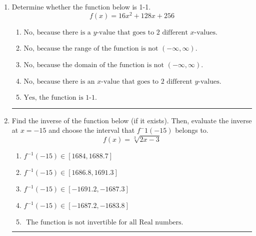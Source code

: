 \documentclass[14pt]{extbook}
\newcommand{\litem}[1]{\item#1\hspace*{-1cm}\rule{\textwidth}{0.4pt}}
\begin{document}
\begin{enumerate}
{\begin{enumerate}[label=\Alph*.]
\end{enumerate} }
\litem{
Determine whether the function below is 1-1.\[ f(x) = 16 x^2 + 128 x + 256 \]\begin{enumerate}[label=\Alph*.]
\item \( \text{No, because there is a $y$-value that goes to 2 different $x$-values.} \)
\item \( \text{No, because the range of the function is not $(-\infty, \infty)$.} \)
\item \( \text{No, because the domain of the function is not $(-\infty, \infty)$.} \)
\item \( \text{No, because there is an $x$-value that goes to 2 different $y$-values.} \)
\item \( \text{Yes, the function is 1-1.} \)

\end{enumerate} }
\litem{
Find the inverse of the function below (if it exists). Then, evaluate the inverse at $x = -15$ and choose the interval that $f^-1(-15)$ belongs to.\[ f(x) = \sqrt[3]{2 x - 3} \]\begin{enumerate}[label=\Alph*.]
\item \( f^{-1}(-15) \in [1684, 1688.7] \)
\item \( f^{-1}(-15) \in [1686.8, 1691.3] \)
\item \( f^{-1}(-15) \in [-1691.2, -1687.3] \)
\item \( f^{-1}(-15) \in [-1687.2, -1683.8] \)
\item \( \text{ The function is not invertible for all Real numbers. } \)

\end{enumerate} }
\end{enumerate}
\end{document}
